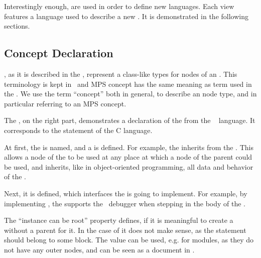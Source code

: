 Interestingly enough,  are used in order to define new languages. Each view features a language used to describe a new .
It is demonstrated in the following sections.

\subsection{Concept Declaration}
\label{mpsconceptdeclaration}

, as it is described in the , represent a class-like types for nodes of an . This terminology is kept in \jbmps\ and 
MPS concept has the same meaning as  term used in the . We use the term ``concept'' both in general, to describe an  node type,
and in particular referring to an MPS concept.

%

The , on the right part, demonstrates a declaration of the   from the \mbdr\  language.
It corresponds to the  statement of the C language.

At first, the  is named, and a  is defined. For example, the   inherits from 
the  . 
This allows a node of the    to be used at any place at which a node of the parent   
could be used, and inherits, like in object-oriented  programming, all data and behavior of the .

Next, it is defined, which interfaces the  is going to implement. For example, by implementing , the 
supports the \mbdr\ debugger when stepping in the body of the .

The ``instance can be root'' property defines, if it is meaningful to create a  without a parent  for it. In the case
of  it does not make sense, as the statement should belong to some block. The  value can be used, e.g. for modules,
as they do not have any outer nodes, and can be seen as a document in \jbmps.

